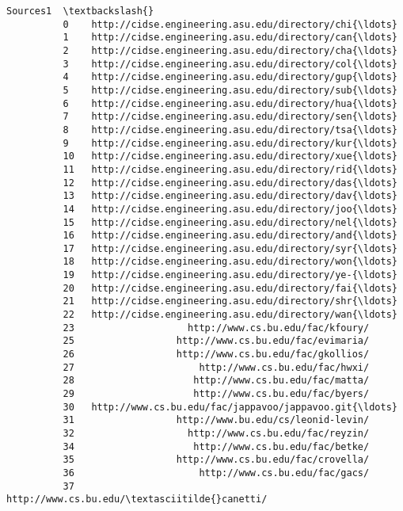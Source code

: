 \documentclass[11pt]{article}
\begin{document}
\begin{Verbatim}[commandchars=\\\{\}]
                                                        Sources1  \textbackslash{}
          0    http://cidse.engineering.asu.edu/directory/chi{\ldots}   
          1    http://cidse.engineering.asu.edu/directory/can{\ldots}   
          2    http://cidse.engineering.asu.edu/directory/cha{\ldots}   
          3    http://cidse.engineering.asu.edu/directory/col{\ldots}   
          4    http://cidse.engineering.asu.edu/directory/gup{\ldots}   
          5    http://cidse.engineering.asu.edu/directory/sub{\ldots}   
          6    http://cidse.engineering.asu.edu/directory/hua{\ldots}   
          7    http://cidse.engineering.asu.edu/directory/sen{\ldots}   
          8    http://cidse.engineering.asu.edu/directory/tsa{\ldots}   
          9    http://cidse.engineering.asu.edu/directory/kur{\ldots}   
          10   http://cidse.engineering.asu.edu/directory/xue{\ldots}   
          11   http://cidse.engineering.asu.edu/directory/rid{\ldots}   
          12   http://cidse.engineering.asu.edu/directory/das{\ldots}   
          13   http://cidse.engineering.asu.edu/directory/dav{\ldots}   
          14   http://cidse.engineering.asu.edu/directory/joo{\ldots}   
          15   http://cidse.engineering.asu.edu/directory/nel{\ldots}   
          16   http://cidse.engineering.asu.edu/directory/and{\ldots}   
          17   http://cidse.engineering.asu.edu/directory/syr{\ldots}   
          18   http://cidse.engineering.asu.edu/directory/won{\ldots}   
          19   http://cidse.engineering.asu.edu/directory/ye-{\ldots}   
          20   http://cidse.engineering.asu.edu/directory/fai{\ldots}   
          21   http://cidse.engineering.asu.edu/directory/shr{\ldots}   
          22   http://cidse.engineering.asu.edu/directory/wan{\ldots}   
          23                    http://www.cs.bu.edu/fac/kfoury/   
          25                  http://www.cs.bu.edu/fac/evimaria/   
          26                  http://www.cs.bu.edu/fac/gkollios/   
          27                      http://www.cs.bu.edu/fac/hwxi/   
          28                     http://www.cs.bu.edu/fac/matta/   
          29                     http://www.cs.bu.edu/fac/byers/   
          30   http://www.cs.bu.edu/fac/jappavoo/jappavoo.git{\ldots}   
          31                  http://www.bu.edu/cs/leonid-levin/   
          32                    http://www.cs.bu.edu/fac/reyzin/   
          34                     http://www.cs.bu.edu/fac/betke/   
          35                  http://www.cs.bu.edu/fac/crovella/   
          36                      http://www.cs.bu.edu/fac/gacs/   
          37                      http://www.cs.bu.edu/\textasciitilde{}canetti/   

\end{Verbatim}
\end{document}
